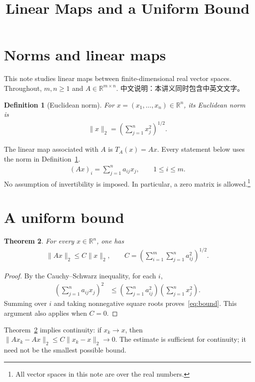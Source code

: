 \documentclass[UTF8,12pt,fontset=fandol]{ctexart}
\title{Linear Maps and a Uniform Bound}
\author{}
\date{}
\newcommand{\R}{\mathbb{R}}
\newtheorem{definition}{Definition}[section]
\newtheorem{theorem}[definition]{Theorem}
\begin{document}
\maketitle
\section{Norms and linear maps}
This note studies linear maps between finite-dimensional real vector spaces. Throughout, $m,n\geq1$ and $A\in\R^{m\times n}$. 中文说明：本讲义同时包含中英文文字。
\begin{definition}[Euclidean norm]\label{def:norm}
For $x=(x_1,\ldots,x_n)\in\R^n$, its Euclidean norm is
\begin{align}\label{eq:norm}
\|x\|_2=\left(\sum_{j=1}^n x_j^2\right)^{1/2}.
\end{align}
\end{definition}
The linear map associated with $A$ is $T_A(x)=Ax$. Every statement below uses the norm in Definition~\ref{def:norm}.
\begin{align}\label{eq:product}
(Ax)_i=\sum_{j=1}^n a_{ij}x_j,\qquad 1\leq i\leq m.
\end{align}
No assumption of invertibility is imposed. In particular, a zero matrix is allowed.\footnote{All vector spaces in this note are over the real numbers.}

\newpage
\section{A uniform bound}
\begin{theorem}\label{thm:bound}
For every $x\in\R^n$, one has
\begin{align}\label{eq:bound}
\|Ax\|_2\leq C\|x\|_2,\qquad C=\left(\sum_{i=1}^m\sum_{j=1}^n a_{ij}^2\right)^{1/2}.
\end{align}
\end{theorem}
\begin{proof}
By the Cauchy--Schwarz inequality, for each $i$,
\begin{align*}
\left(\sum_{j=1}^n a_{ij}x_j\right)^2
&\leq\left(\sum_{j=1}^n a_{ij}^2\right)\left(\sum_{j=1}^n x_j^2\right).
\end{align*}
Summing over $i$ and taking nonnegative square roots proves~\eqref{eq:bound}. This argument also applies when $C=0$.
\end{proof}
Theorem~\ref{thm:bound} implies continuity: if $x_k\to x$, then $\|Ax_k-Ax\|_2\leq C\|x_k-x\|_2\to0$. The estimate is sufficient for continuity; it need not be the smallest possible bound.
\end{document}
